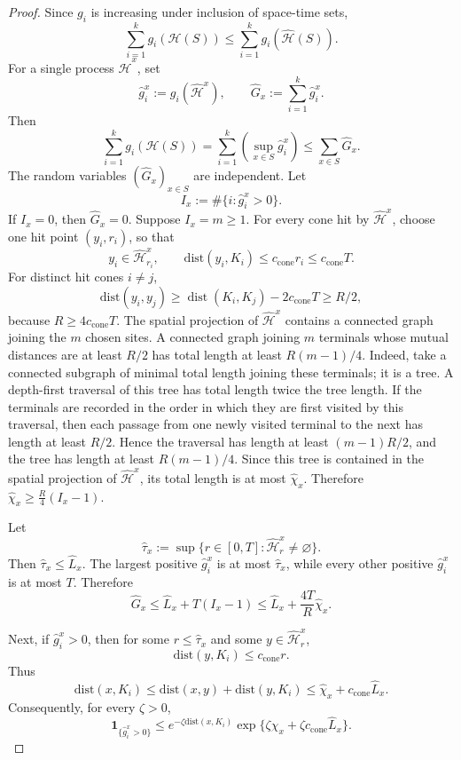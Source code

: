 \documentclass[letterpaper,11pt,reqno]{amsart}
\theoremstyle{definition}
\newcommand{\dist}{\mathrm{dist}}
\begin{document}
\begin{proof}
Since \(g_i\) is
increasing under inclusion of space-time sets,
\[
        \sum_{i=1}^k g_i(\mathcal H(S))
        \le
        \sum_{i=1}^k g_i(\widehat{\mathcal H}(S)).
\]
For a single process \(\widehat{\mathcal H}^x\), set
\[
        \widehat g_i^x
        :=
        g_i(\widehat{\mathcal H}^x),
        \qquad
        \widehat G_x:=\sum_{i=1}^k \widehat g_i^x .
\]
Then
\[
        \sum_{i=1}^k g_i(\mathcal H(S))
        =\sum_{i=1}^k \left(\sup_{x\in S}\widehat g_i^x\right)
        \le
        \sum_{x\in S}\widehat G_x .
\]
The random variables \((\widehat G_x)_{x\in S}\) are independent.
Let
\[
        I_x:=\#\{i:\widehat g_i^x>0\}.
\]
If \(I_x=0\), then \(\widehat G_x=0\). Suppose
\(I_x=m\ge1\). For every cone hit by \(\widehat{\mathcal H}^x\), choose one hit
point \((y_i,r_i)\), so that
\[
        y_i\in\widehat{\mathcal H}^x_{r_i},
        \qquad
        \dist(y_i,K_i)\le c_{\mathrm{cone}}r_i\le c_{\mathrm{cone}}T .
\]
For distinct hit cones \(i\ne j\),
\[
        \dist(y_i,y_j)
        \ge
        \operatorname{dist}(K_i,K_j)-2c_{\mathrm{cone}}T
        \ge R/2,
\]
because \(R\ge4c_{\mathrm{cone}}T\). The spatial projection of \(\widehat{\mathcal H}^x\) contains a connected graph joining
the \(m\) chosen sites. A connected graph joining \(m\) terminals whose mutual
distances are at least \(R/2\) has total length at least \(R(m-1)/4\). Indeed,
take a connected subgraph of minimal total length joining these terminals; it
is a tree. A depth-first traversal of this tree has total length twice the tree
length. If the terminals are recorded in the order in which they are first
visited by this traversal, then each passage from one newly visited terminal to
the next has length at least \(R/2\). Hence the traversal has length at least
\((m-1)R/2\), and the tree has length at least \(R(m-1)/4\). Since this tree is
contained in the spatial projection of \(\widehat{\mathcal H}^x\), its total length is at
most \(\widehat\chi_x\). Therefore $\widehat\chi_x
        \ge
        \frac R4(I_x-1)$.


Let
\[
        \widehat\tau_x:=
        \sup\{r\in[0,T]:\widehat{\mathcal H}^x_r\ne\varnothing\}.
\]
Then \(\widehat\tau_x\le\widehat L_x\). The largest positive
\(\widehat g_i^x\) is at most \(\widehat\tau_x\), while every other positive
\(\widehat g_i^x\) is at most \(T\). Therefore
\[
        \widehat G_x
        \le
        \widehat L_x+T(I_x-1)
        \le
        \widehat L_x+\frac{4T}{R}\widehat\chi_x .
\]

Next, if \(\widehat g_i^x>0\), then for some \(r\le\widehat\tau_x\) and some
\(y\in\widehat{\mathcal H}^x_r\),
\[
        \dist(y,K_i)\le c_{\mathrm{cone}}r.
\]
Thus
\[
        \dist(x,K_i)
        \le
        \dist(x,y)+\dist(y,K_i)
        \le
        \widehat\chi_x+c_{\mathrm{cone}}\widehat L_x .
\]
Consequently, for every \(\zeta>0\),
\[
        \mathbf 1_{\{\widehat g_i^x>0\}}
        \le
        e^{-\zeta\dist(x,K_i)}
        \exp\{\zeta\widehat\chi_x+\zeta c_{\mathrm{cone}}\widehat L_x\}.
\]


\end{proof}
\end{document}

